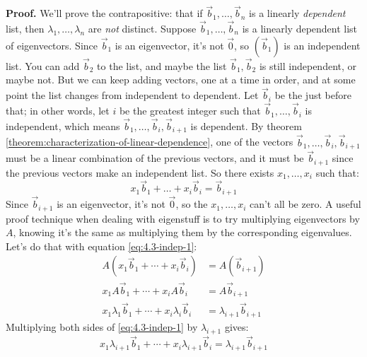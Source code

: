 \documentclass[11pt, letterpaper]{report}
\newenvironment{notes}{}{}
\newenvironment{book}{}{}
\newcounter{theorem}[chapter]
\begin{document}
\begin{notes}
\vspace{6in}
\end{notes}

\begin{book}
\textbf{Proof.} We'll prove the contrapositive: that if $\vec{b}_1,\ldots,\vec{b}_n$ is a linearly \emph{dependent} list, then $\lambda_1,\ldots,\lambda_n$ are \emph{not} distinct. Suppose $\vec{b}_1,\ldots,\vec{b}_n$ is a linearly dependent list of eigenvectors. Since $\vec{b}_1$ is an eigenvector, it's not $\vec{0}$, so $( \vec{b}_1 )$ is an independent list. You can add $\vec{b}_2$ to the list, and maybe the list $\vec{b}_1,\vec{b}_2$ is still independent, or maybe not. But we can keep adding vectors, one at a time in order, and at some point the list changes from independent to dependent. Let $\vec{b}_i$ be the just before that; in other words, let $i$ be the greatest integer such that $\vec{b}_1,\ldots, \vec{b}_i$ is independent, which means $\vec{b}_1,\ldots, \vec{b}_i,\vec{b}_{i+1}$ is dependent. By theorem \ref{theorem:characterization-of-linear-dependence}, one of the vectors $\vec{b}_1,\ldots, \vec{b}_i,\vec{b}_{i+1}$ must be a linear combination of the previous vectors, and it must be $\vec{b}_{i+1}$ since the previous vectors make an independent list. So there exists $x_1,\ldots,x_i$ such that:
\begin{equation}
\label{eq:4.3-indep-1}
x_1\vec{b}_1+ \ldots + x_i\vec{b}_i = \vec{b}_{i+1}
\end{equation}
Since $\vec{b}_{i+1}$ is an eigenvector, it's not $\vec{0}$, so the $x_1,\ldots,x_i$ can't all be zero. A useful proof technique when dealing with eigenstuff is to try multiplying eigenvectors by $A$, knowing it's the same as multiplying them by the corresponding eigenvalues. Let's do that with equation \ref{eq:4.3-indep-1}:
\begin{align}
\label{eq:4.3-indep-2}
A ( x_1\vec{b}_1+ \cdots + x_i\vec{b}_i ) &= A(\vec{b}_{i+1} ) \nonumber \\
x_1A\vec{b}_1+ \cdots + x_iA\vec{b}_i &= A\vec{b}_{i+1} \nonumber \\
x_1\lambda_1\vec{b}_1+ \cdots + x_i\lambda_i\vec{b}_i &= \lambda_{i+1}\vec{b}_{i+1} 
\end{align}
Multiplying both sides of \ref{eq:4.3-indep-1} by $\lambda_{i+1}$ gives:
\begin{equation}
\label{eq:4.3-indep-3}
x_1\lambda_{i+1}\vec{b}_1+ \cdots + x_i\lambda_{i+1}\vec{b}_i = \lambda_{i+1}\vec{b}_{i+1}
\end{equation}

\end{book}
\end{document}
